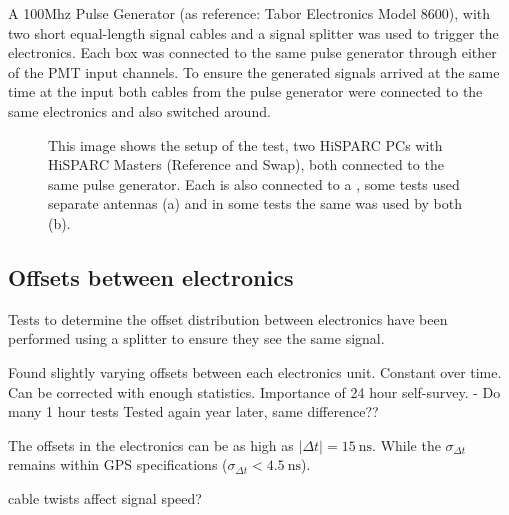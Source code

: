 A 100Mhz Pulse Generator (as reference: Tabor Electronics Model 8600),
with two short equal-length signal cables and a signal splitter was used
to trigger the \hisparc electronics. Each box was connected to the same
pulse generator through either of the PMT input channels. To ensure the
generated signals arrived at the same time at the input both cables from
the pulse generator were connected to the same \hisparc electronics and
also switched around.

\begin{figure}
    \centering
    
    \caption{This image shows the setup of the test, two HiSPARC PCs
             with HiSPARC Masters (Reference and Swap), both connected
             to the same pulse generator. Each is also connected to a
             \gps, some tests used separate \gps antennas (a) and in
             some tests the same \gps was used by both (b).}
    \label{fig:setup}
\end{figure}


\subsection{Offsets between \hisparc electronics}
\label{sub:gps_offsets}

Tests to determine the offset distribution between \hisparc electronics
have been performed using a \gps splitter to ensure they see the same
\gps signal.

Found slightly varying offsets between each \hisparc electronics unit.
Constant over time. Can be corrected with enough statistics.
Importance of 24 hour self-survey. - Do many 1 hour tests
Tested again year later, same difference??

The offsets in the \hisparc electronics can be as high as $|\Delta t| =
\SI{15}{\nano\second}$. While the $\sigma_{\Delta t}$ remains within GPS
specifications ($\sigma_{\Delta t} < \SI{4.5}{\nano\second}$).


\gps cable twists affect signal speed?

